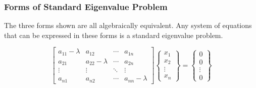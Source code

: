 \documentclass[fleqn]{ltx-talk} %
\newcommand{\sectionIIsubsectionItitle}{Forms of Standard Eigenvalue Problem}
\begin{document}
			\begin{frame}
				\frametitle{\sectionIIsubsectionItitle} \small
				\bigskip

 The three forms shown are all algebraically equivalent. Any system
  of equations that can be expressed in these forms is a standard
  eigenvalue problem.

  \begin{displaymath}
    \left[ \begin{array}{cccc}
        a_{11}-\lambda & a_{12} & \cdots & a_{1n} \\
        a_{21} & a_{22}-\lambda & \cdots & a_{2n} \\
        \vdots & \vdots & \ddots & \vdots \\
        a_{n1} & a_{n2} & \cdots & a_{nn}-\lambda
      \end{array} \right]
    \left\{ \begin{array}{c}
        x_1 \\
        x_2 \\
        \vdots \\
        x_n
      \end{array} \right\} =
    \left\{ \begin{array}{c}
        0 \\
        0 \\
        \vdots \\
        0
      \end{array} \right\}
  \end{displaymath}				

			
				\btVFill
			\end{frame}	
\end{document}
